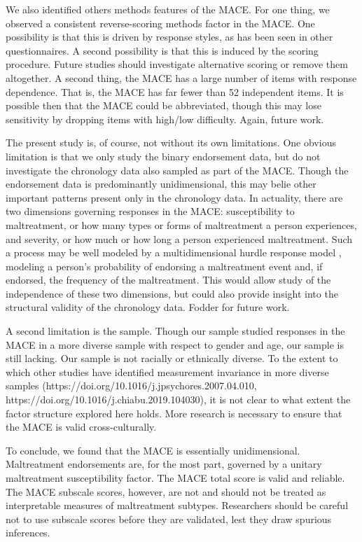 \documentclass[letterpaper,man,natbib]{apa6}  %
\begin{document}
We also identified others methods features of the MACE. For one thing, we observed a consistent reverse-scoring methods factor in the MACE. One possibility is that this is driven by response styles, as has been seen in other questionnaires. A second possibility is that this is induced by the scoring procedure. Future studies should investigate alternative scoring or remove them altogether. A second thing, the MACE has a large number of items with response dependence. That is, the MACE has far fewer than 52 independent items. It is possible then that the MACE could be abbreviated, though this may lose sensitivity by dropping items with high/low difficulty. Again, future work. 

The present study is, of course, not without its own limitations. One obvious limitation is that we only study the binary endorsement data, but do not investigate the chronology data also sampled as part of the MACE. Though the endorsement data is predominantly unidimensional, this may belie other important patterns present only in the chronology data. In actuality, there are two dimensions governing responses in the MACE: susceptibility to maltreatment, or how many types or forms of maltreatment a person experiences, and severity, or how much or how long a person experienced maltreatment. Such a process may be well modeled by a multidimensional hurdle response model \citep{magnus2021symptom}, modeling a person's probability of endorsing a maltreatment event and, if endorsed, the frequency of the maltreatment. This would allow study of the independence of these two dimensions, but could also provide insight into the structural validity of the chronology data. Fodder for future work.

A second limitation is the sample. Though our sample studied responses in the MACE in a more diverse sample with respect to gender and age, our sample is still lacking. Our sample is not racially or ethnically diverse. To the extent to which other studies have identified measurement invariance in more diverse samples (https://doi.org/10.1016/j.jpsychores.2007.04.010, https://doi.org/10.1016/j.chiabu.2019.104030), it is not clear to what extent the factor structure explored here holds. More research is necessary to ensure that the MACE is valid cross-culturally. 

To conclude, we found that the MACE is essentially unidimensional. Maltreatment endorsements are, for the most part, governed by a unitary maltreatment susceptibility factor. The MACE total score is valid and reliable. The MACE subscale scores, however, are not and should not be treated as interpretable measures of maltreatment subtypes. Researchers should be careful not to use subscale scores before they are validated, lest they draw spurious inferences.  
\end{document}
